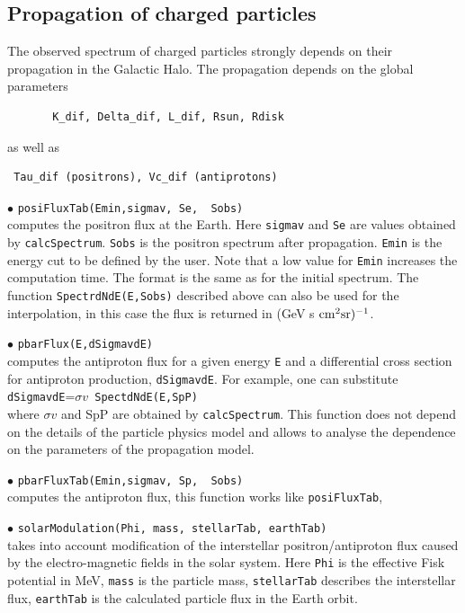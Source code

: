 \documentclass[12pt,a4paper]{article}
\begin{document}
\subsection{Propagation of charged particles}

The observed spectrum of charged particles  strongly depends on their propagation
in the Galactic Halo. The propagation depends on the global parameters 
\begin{verbatim}
       K_dif, Delta_dif, L_dif, Rsun, Rdisk
\end{verbatim}
as well as 
\begin{verbatim}
 Tau_dif (positrons), Vc_dif (antiprotons)
\end{verbatim}

\noindent  
$\bullet$ \verb|posiFluxTab(Emin,sigmav, Se,  Sobs)|\\
computes the positron flux at the Earth. Here \verb|sigmav| and \verb|Se| are values obtained by 
\verb|calcSpectrum|.  \verb|Sobs| is the positron spectrum after propagation. \verb|Emin| is the energy cut to be defined by the user. Note that
a low value for \verb|Emin| increases the computation time.
The  format is the same as for the initial spectrum. The function  
\verb|SpectrdNdE(E,Sobs)| described above can also be used for the interpolation, in this case the flux is
returned in (GeV s ${\rm cm}^2 {\rm sr})^{-1}$. 

\noindent
$\bullet$ \verb|pbarFlux(E,dSigmavdE)|\\
computes the antiproton flux for a given energy {\tt E} and a 
differential cross section for antiproton production, {\tt dSigmavdE}.
For example, one can substitute\\ {\tt dSigmavdE}=$\sigma v${\tt
SpectdNdE(E,SpP)} \\
where $ \sigma v$ and {SpP} are obtained by {\tt calcSpectrum}.
This function does not depend on the details of the particle physics  model and allows to analyse the dependence on the
parameters of the propagation model.

\noindent
$\bullet$ \verb|pbarFluxTab(Emin,sigmav, Sp,  Sobs)|\\
computes the antiproton flux, this function works like \verb|posiFluxTab|,

\noindent
$\bullet$ \verb|solarModulation(Phi, mass, stellarTab, earthTab)|\\
takes into account modification of the interstellar positron/antiproton flux 
caused by the electro-magnetic fields in the solar system. Here \verb|Phi| is the
effective Fisk potential in MeV, \verb|mass| is the particle mass,
\verb|stellarTab| describes the interstellar flux, \verb|earthTab| 
is the calculated particle flux in the Earth orbit.
\end{document}
